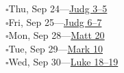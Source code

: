 \hypertarget{rp-2026-09-24}{}\noindent$\square$\enspace Thu, Sep 24\enspace---\enspace \hyperlink{ch-judges-3}{Judg 3--5}\\
\hypertarget{rp-2026-09-25}{}\noindent$\square$\enspace Fri, Sep 25\enspace---\enspace \hyperlink{ch-judges-6}{Judg 6--7}\\
\hypertarget{rp-2026-09-28}{}\noindent$\square$\enspace Mon, Sep 28\enspace---\enspace \hyperlink{ch-matthew-20}{Matt 20}\\
\hypertarget{rp-2026-09-29}{}\noindent$\square$\enspace Tue, Sep 29\enspace---\enspace \hyperlink{ch-mark-10}{Mark 10}\\
\hypertarget{rp-2026-09-30}{}\noindent$\square$\enspace Wed, Sep 30\enspace---\enspace \hyperlink{ch-luke-18}{Luke 18--19}\\
\clearpage
\twocolumn[%
  \vspace*{20pt}%
  {\centering\huge\booktitlefont\scshape October 2026\\%
  \char"2766\par}%
  \vspace{10pt}%
]

